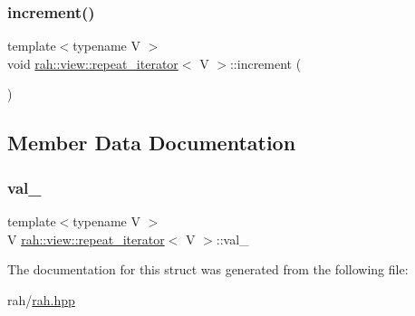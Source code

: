 \mbox{\label{structrah_1_1view_1_1repeat__iterator_a5556f69de4c759f4fec42c12d70ea869}} 
\subsubsection{\texorpdfstring{increment()}{increment()}}
{\footnotesize\ttfamily template$<$typename V $>$ \\
void \mbox{\hyperlink{structrah_1_1view_1_1repeat__iterator}{rah\+::view\+::repeat\+\_\+iterator}}$<$ V $>$\+::increment (\begin{DoxyParamCaption}{ }\end{DoxyParamCaption})\hspace{0.3cm}{\ttfamily [inline]}}



\subsection{Member Data Documentation}
\mbox{\label{structrah_1_1view_1_1repeat__iterator_a6286ca38cb848630cb870dc6ab42eb79}} 
\subsubsection{\texorpdfstring{val\_}{val\_}}
{\footnotesize\ttfamily template$<$typename V $>$ \\
V \mbox{\hyperlink{structrah_1_1view_1_1repeat__iterator}{rah\+::view\+::repeat\+\_\+iterator}}$<$ V $>$\+::val\+\_\+}



The documentation for this struct was generated from the following file\+:\begin{DoxyCompactItemize}
\item 
rah/\mbox{\hyperlink{rah_8hpp}{rah.\+hpp}}\end{DoxyCompactItemize}
